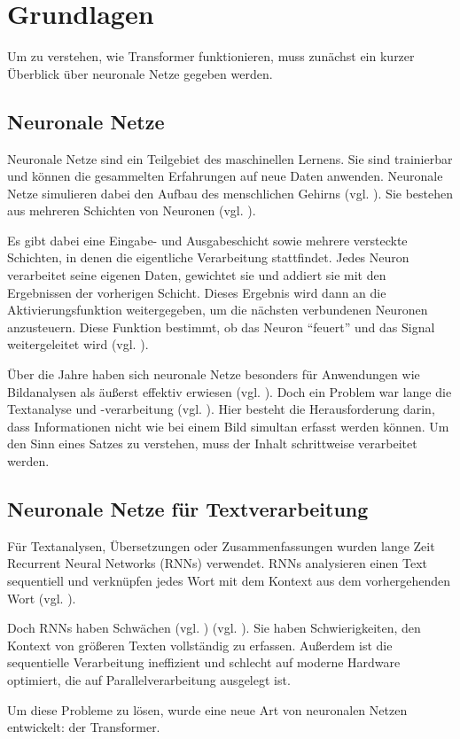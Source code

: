\chapter{Grundlagen}

Um zu verstehen, wie Transformer funktionieren, muss zunächst ein kurzer Überblick über neuronale Netze gegeben werden.  

\section{Neuronale Netze}

Neuronale Netze sind ein Teilgebiet des maschinellen Lernens.
Sie sind trainierbar und können die gesammelten Erfahrungen auf neue Daten anwenden.  
Neuronale Netze simulieren dabei den Aufbau des menschlichen Gehirns (vgl. \cite[S. 14]{Kinnebrock.2018}).  
Sie bestehen aus mehreren Schichten von Neuronen (vgl. \cite[S. 25]{Kinnebrock.2018}).  

Es gibt dabei eine Eingabe- und Ausgabeschicht sowie mehrere versteckte Schichten, in denen die eigentliche Verarbeitung stattfindet.  
Jedes Neuron verarbeitet seine eigenen Daten, gewichtet sie und addiert sie mit den Ergebnissen der vorherigen Schicht.  
Dieses Ergebnis wird dann an die Aktivierungsfunktion weitergegeben, um die nächsten verbundenen Neuronen anzusteuern.  
Diese Funktion bestimmt, ob das Neuron \enquote{feuert} und das Signal weitergeleitet wird (vgl. \cite[S. 14]{Kinnebrock.2018}).  

Über die Jahre haben sich neuronale Netze besonders für Anwendungen wie Bildanalysen als äußerst effektiv erwiesen (vgl. \cite[S. 16]{paass.2020}).  
Doch ein Problem war lange die Textanalyse und -verarbeitung (vgl. \cite[S. 22]{paass.2020}).
Hier besteht die Herausforderung darin, dass Informationen nicht wie bei einem Bild simultan erfasst werden können.  
Um den Sinn eines Satzes zu verstehen, muss der Inhalt schrittweise verarbeitet werden.  

\section{Neuronale Netze für Textverarbeitung}

Für Textanalysen, Übersetzungen oder Zusammenfassungen wurden lange Zeit Recurrent Neural Networks (RNNs) verwendet.  
RNNs analysieren einen Text sequentiell und verknüpfen jedes Wort mit dem Kontext aus dem vorhergehenden Wort (vgl. \cite[S. 2]{attention}).  

Doch RNNs haben Schwächen (vgl. \cite[S. 2]{attention}) (vgl. \cite[S. 208]{paass.2020}).
Sie haben Schwierigkeiten, den Kontext von größeren Texten vollständig zu erfassen.  
Außerdem ist die sequentielle Verarbeitung ineffizient und schlecht auf moderne Hardware optimiert, die auf Parallelverarbeitung ausgelegt ist.  

Um diese Probleme zu lösen, wurde eine neue Art von neuronalen Netzen entwickelt: der Transformer.  
